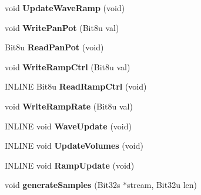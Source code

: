 \begin{DoxyCompactItemize}
\item 
\hypertarget{classGUSChannels_a991170f0ee90862e983266eb368d32b7}{void {\bfseries Update\-Wave\-Ramp} (void)}\label{classGUSChannels_a991170f0ee90862e983266eb368d32b7}

\item 
\hypertarget{classGUSChannels_ad5ef507b7016d955efd1482ca40bea80}{void {\bfseries Write\-Pan\-Pot} (Bit8u val)}\label{classGUSChannels_ad5ef507b7016d955efd1482ca40bea80}

\item 
\hypertarget{classGUSChannels_a95be72c2edb80f462e55fa34d5bbfb0c}{Bit8u {\bfseries Read\-Pan\-Pot} (void)}\label{classGUSChannels_a95be72c2edb80f462e55fa34d5bbfb0c}

\item 
\hypertarget{classGUSChannels_a51d38575b34383d7775f10cb48b8d1dc}{void {\bfseries Write\-Ramp\-Ctrl} (Bit8u val)}\label{classGUSChannels_a51d38575b34383d7775f10cb48b8d1dc}

\item 
\hypertarget{classGUSChannels_a67542e94a74547308f3cebe839dff17e}{I\-N\-L\-I\-N\-E Bit8u {\bfseries Read\-Ramp\-Ctrl} (void)}\label{classGUSChannels_a67542e94a74547308f3cebe839dff17e}

\item 
\hypertarget{classGUSChannels_a81dca3a9a68b6e1bb466d5ded2a0a6d4}{void {\bfseries Write\-Ramp\-Rate} (Bit8u val)}\label{classGUSChannels_a81dca3a9a68b6e1bb466d5ded2a0a6d4}

\item 
\hypertarget{classGUSChannels_a53df82759ffc2b824cfa3a50d76f265b}{I\-N\-L\-I\-N\-E void {\bfseries Wave\-Update} (void)}\label{classGUSChannels_a53df82759ffc2b824cfa3a50d76f265b}

\item 
\hypertarget{classGUSChannels_add1d0b84f2f784afae363fa360ee414e}{I\-N\-L\-I\-N\-E void {\bfseries Update\-Volumes} (void)}\label{classGUSChannels_add1d0b84f2f784afae363fa360ee414e}

\item 
\hypertarget{classGUSChannels_a97d0c92f732774254834ddd0e23b6281}{I\-N\-L\-I\-N\-E void {\bfseries Ramp\-Update} (void)}\label{classGUSChannels_a97d0c92f732774254834ddd0e23b6281}

\item 
\hypertarget{classGUSChannels_a2ca162860f106821202ca051cf6c75f2}{void {\bfseries generate\-Samples} (Bit32s $\ast$stream, Bit32u len)}\label{classGUSChannels_a2ca162860f106821202ca051cf6c75f2}

\end{DoxyCompactItemize}
